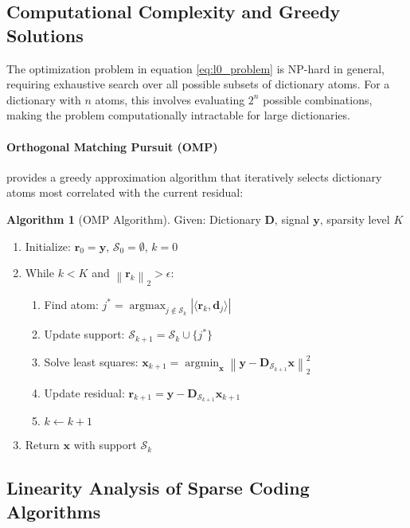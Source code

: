 \documentclass[12pt]{article}
\renewcommand{\vec}[1]{\mathbf{#1}}
\DeclareMathOperator{\argmin}{argmin}
\DeclareMathOperator{\argmax}{argmax}
\newcommand{\norm}[1]{\left\|#1\right\|}
\theoremstyle{definition}
\newtheorem{algorithm}[theorem]{Algorithm}
\begin{document}
\subsection{Computational Complexity and Greedy Solutions}

The optimization problem in equation \eqref{eq:l0_problem} is NP-hard in general, requiring exhaustive search over all possible subsets of dictionary atoms. For a dictionary with $n$ atoms, this involves evaluating $2^n$ possible combinations, making the problem computationally intractable for large dictionaries.

\paragraph{Orthogonal Matching Pursuit (OMP)} provides a greedy approximation algorithm that iteratively selects dictionary atoms most correlated with the current residual:

\begin{algorithm}[OMP Algorithm]
    \label{alg:omp}
    Given: Dictionary $\mathbf{D}$, signal $\vec{y}$, sparsity level $K$
    \begin{enumerate}
        \item Initialize: $\vec{r}_0 = \vec{y}$, $\mathcal{S}_0 = \emptyset$, $k = 0$
        \item While $k < K$ and $\norm{\vec{r}_k}_2 > \epsilon$:
              \begin{enumerate}
                  \item Find atom: $j^* = \argmax_{j \notin \mathcal{S}_k} |\langle \vec{r}_k, \vec{d}_j \rangle|$
                  \item Update support: $\mathcal{S}_{k+1} = \mathcal{S}_k \cup \{j^*\}$
                  \item Solve least squares: $\vec{x}_{k+1} = \argmin_{\vec{x}} \norm{\vec{y} - \mathbf{D}_{\mathcal{S}_{k+1}}\vec{x}}_2^2$
                  \item Update residual: $\vec{r}_{k+1} = \vec{y} - \mathbf{D}_{\mathcal{S}_{k+1}}\vec{x}_{k+1}$
                  \item $k \leftarrow k + 1$
              \end{enumerate}
        \item Return $\vec{x}$ with support $\mathcal{S}_k$
    \end{enumerate}
\end{algorithm}

\subsection{Linearity Analysis of Sparse Coding Algorithms}
\end{document}

